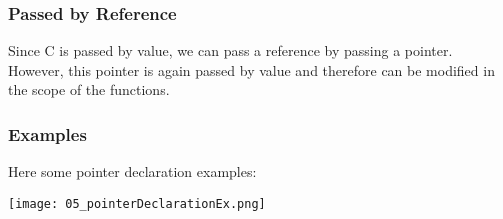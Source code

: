 \subsubsection{Passed by Reference}
Since C is passed by value, we can pass a reference by passing a pointer. However, this pointer is again passed by value and therefore can be modified in the scope of the functions.

\subsubsection{Examples}
Here some pointer declaration examples:

\texttt{[image: 05\_pointerDeclarationEx.png]}
